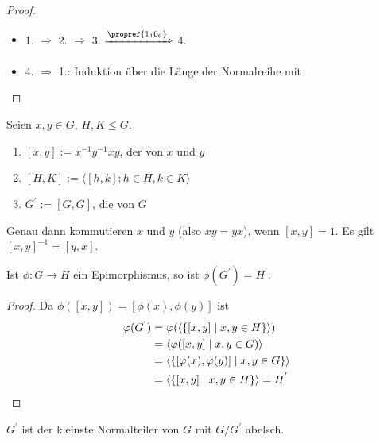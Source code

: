 \begin{proof}
		\begin{itemize}
			\item 1. $\Rightarrow$ 2. $\Rightarrow$ 3. $\xRightarrow{\propref{1_10_6}}$ 4.
			\item 4. $\Rightarrow$ 1.: Induktion über die Länge der Normalreihe mit 
		\end{itemize}
\end{proof}

\begin{definition}
	Seien $x,y \in G$, $H,K \leq G$.
	\begin{enumerate}
		\item $[x,y] := x^{-1}y^{-1}xy$, der  von $x$ und $y$
		\item $[H,K] := \langle[h,k]\colon h \in H, k\in K\rangle$
		\item $G^{'} := [G,G]$, die  von $G$
	\end{enumerate}
\end{definition}

\begin{remark}
	Genau dann kommutieren $x$ und $y$ (also $xy = yx$), wenn $[x,y] = 1$. Es gilt $[x,y]^{-1} = [y,x]$.
\end{remark}

\begin{lemma}
	Ist $\phi: G \to H$ ein Epimorphismus, so ist $\phi(G^{'}) = H^{'}$.
\end{lemma}

\begin{proof}
	Da $\phi([x,y]) = [\phi(x),\phi(y)]$ ist
	\begin{align}
	\phi(G^{'}) &= \phi(\langle\{ [x,y] \mid x,y \in H \}\rangle)\notag\\
	&= \langle\phi([x,y] \mid x,y \in G) \rangle \notag\\
	&= \langle\{[\phi(x),\phi(y)] \mid x,y \in G\}\rangle\notag \\
	&= \langle \{ [x,y] \mid x,y \in H \}\rangle = H^{'} \notag
	\end{align}
\end{proof}

\begin{lemma}
	$G^{'}$ ist der kleinste Normalteiler von $G$ mit $G/G^{'}$ abelsch.
\end{lemma}

